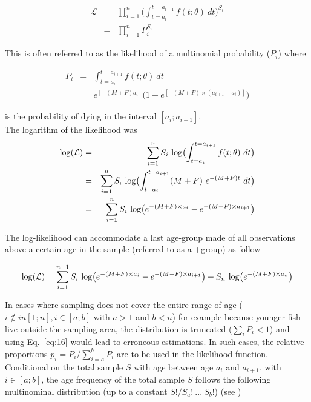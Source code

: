 \begin{eqnarray}
\mathcal{L}  &=& \prod_{i=1}^{n} \bigl ( \int_{t=a_{i}}^{t=a_{i+1}} f(t; \theta) \ dt \bigr ) ^ {S_{i}} \\
            &=& \prod_{i=1}^{n} P_{i} ^ {S_{i}}
\end{eqnarray}

This is often referred to as the likelihood of a multinomial probability ($P_{i}$) where 

\begin{eqnarray}
 P_{i} &=& \int_{t=a_{i}}^{t=a_{i+1}} f(t; \theta) \ dt \\
      &=& e^{[-(M+F) a_{i}]} \bigl ( 1 - e^{[- (M+F) \times (a_{i+1} - a_{i})]}  \bigr )
\end{eqnarray}

\noindent is the probability of dying in the interval $[a_{i}; a_{i+1}]$.\\

The logarithm of the likelihood was
\begin{eqnarray}
{\rm log}(\mathcal{L}) &=& \sum_{i=1}^{n} S_{i} \ {\rm log} \bigl ( \int_{t=a_{i}}^{t=a_{i+1}} f(t; \theta) \ dt \bigr ) \\
                       &=& \sum_{i=1}^{n} S_{i} \ {\rm log} \bigl ( \int_{t=a_{i}}^{t=a_{i+1}} (M + F) \ e^{-(M+F)t} \ dt \bigr ) \\
                       &=& \sum_{i=1}^{n} S_{i} \ {\rm log} \bigl ( e^{-(M+F) \times a_{i}} - e^{-(M+F) \times a_{i+1}} \bigr )
\label{eq:16}
\end{eqnarray}

The log-likelihood can accommodate a last age-group made of all observations above a certain age in the sample (referred to as a +group) as follow \citep{pawitan2013all}

\begin{equation}
{\rm log}(\mathcal{L}) = \sum_{i=1}^{n-1} S_{i} \ {\rm log} \bigl ( e^{-(M+F) \times a_{i}} - e^{-(M+F) \times a_{i+1}} \bigr ) + S_{n} \ {\rm log} \bigl ( e^{-(M+F) \times a_{n}} \bigr )
\end{equation}

In cases where sampling does not cover the entire range of age ($ i \notin in [1;n], i \in [a;b]$ with $a > 1$ and $b < n$) for example because younger fish live outside the sampling area, the distribution is truncated ($\sum_{i} P_i < 1$) and using Eq.~\ref{eq:16} would lead to erroneous estimations. In such cases, the relative proportions $p_i=P_{i} / \sum_{i=a}^{b} P_{i}$ are to be used in the likelihood function. Conditional on the total sample $S$ with age between age $a_i$ and $a_{i+1}$, with $i \in [a;b]$, the age frequency of the total sample $S$ follows the following multinominal distribution (up to a constant $S!/S_a! \ ... \ S_b!$) (see \cite{Wang99a})

